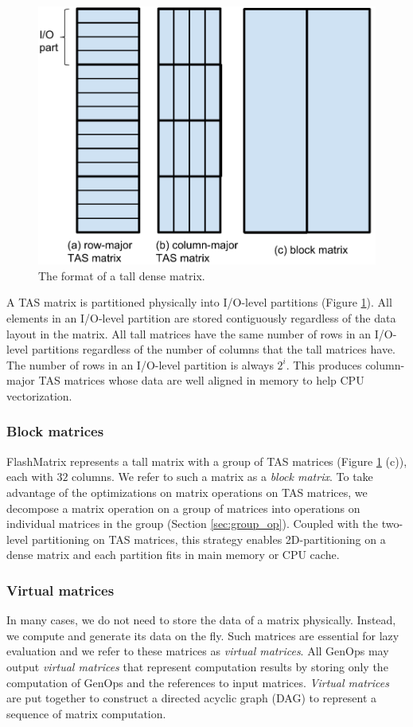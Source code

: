 \begin{figure}
	\centering
	\includegraphics[scale=0.5]{FlashMatrix_figs/dense_matrix2.pdf}
	\caption{The format of a tall dense matrix.}
	\label{fig:den_mat}
\end{figure}

A TAS matrix is partitioned physically into I/O-level partitions (Figure
\ref{fig:den_mat}). All elements in an I/O-level partition are stored
contiguously regardless of the data layout in the matrix. All tall matrices
have the same number of rows in an I/O-level partitions regardless of
the number of columns that the tall matrices have. The number of rows in
an I/O-level partition is always $2^i$. This produces column-major TAS
matrices whose data are well aligned in memory to help CPU vectorization.

\subsubsection{Block matrices} \label{sec:block_mat}
FlashMatrix represents a tall matrix with a group of TAS matrices (Figure
\ref{fig:den_mat} (c)), each with $32$ columns. We refer to such a matrix as
a \textit{block matrix}. To take advantage of the optimizations on matrix
operations on TAS matrices, we decompose a matrix operation on a group of
matrices into operations on individual matrices in the group (Section
\ref{sec:group_op}).
Coupled with the two-level partitioning on TAS matrices, this strategy enables
2D-partitioning on a dense matrix and each partition fits in main memory
or CPU cache.

\subsubsection{Virtual matrices} \label{virt_mat}
In many cases, we do not need to store the data of a matrix physically. Instead,
we compute and generate its data on the fly. Such matrices are essential for
lazy evaluation and we refer to these matrices as \textit{virtual matrices}.
All GenOps may output \textit{virtual matrices} that represent computation
results by storing only the computation of GenOps and the references to input
matrices. \textit{Virtual matrices} are put together to construct a directed
acyclic graph (DAG) to represent a sequence of matrix computation.

